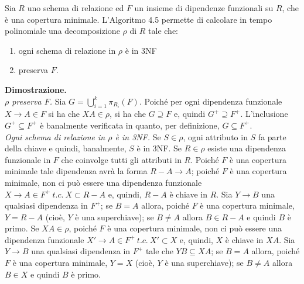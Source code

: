 \begin{theo}
Sia $R$ uno schema di relazione ed $F$ un insieme di dipendenze funzionali su $R$, che è una copertura minimale. 
L'Algoritmo 4.5 permette di calcolare in tempo polinomiale una decomposizione $\rho$ di $R$ tale che:
\begin{enumerate}
 \item ogni schema di relazione in $\rho$ è in 3NF
 \item preserva $F$.
\end{enumerate}
\end{theo}
\textbf{Dimostrazione.}\\
\emph{$\rho$ preserva $F$.} Sia $G = \bigcup_{i=1}^k \pi_{R_i}(F)$. Poiché per ogni dipendenza funzionale $X 
\rightarrow A \in F$ si ha che $XA \in \rho$, si ha che $G \supseteq F$ e, quindi $G^+ \supseteq F^+$. 
L'inclusione $G^+ \subseteq F^+$ è banalmente verificata in quanto, per definizione, $G\subseteq F^+$. \\
\emph{Ogni schema di relazione in $\rho$ è in 3NF.}
Se $S \in \rho$, ogni attributo in $S$ fa parte della chiave e quindi, banalmente, $S$ è in 3NF. Se $R \in \rho$
esiste una dipendenza funzionale in $F$ che coinvolge tutti gli attributi in $R$. Poiché $F$ è una copertura minimale
tale dipendenza avrà la forma $R-A \rightarrow A$; poiché $F$ è una copertura minimale, non ci può essere una 
dipendenza funzionale $X \rightarrow A \in F^+\ t.c.\ X \subset R-A$ e, quindi, $R-A$ è chiave in $R$.
Sia $Y \rightarrow B$ una qualsiasi dipendenza in $F^+$; se $B = A$ allora, poiché $F$ è una copertura minimale, 
$Y = R-A$ (cioè, $Y$ è una superchiave); se $B \not= A$ allora $B \in R-A$ e quindi $B$ è primo.
Se $XA \in \rho$, poiché $F$ è una copertura minimale, non ci può essere una dipendenza funzionale $X' \rightarrow A 
\in F^+\ t.c.\ X' \subset X$ e, quindi, $X$ è chiave in $XA$. Sia $Y \rightarrow B$ una qualsiasi dipendenza in $F^+$ 
tale che $YB \subseteq XA$; se $B = A$ allora, poiché $F$ è una copertura minimale, $Y = X$ (cioè, $Y$ è una 
superchiave); se $B \not= A$ allora $B \in X$ e quindi $B$ è primo.

